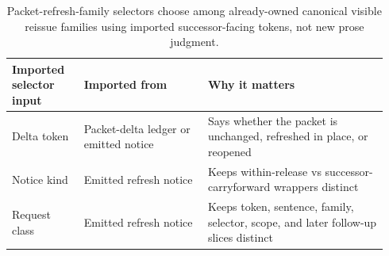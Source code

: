 \documentclass[11pt]{article}
\begin{document}
\begin{table}[t]
\centering
\small
\begin{tabularx}{\linewidth}{@{}p{0.18\linewidth} p{0.31\linewidth} p{0.45\linewidth}@{}}
\toprule
Imported selector input & Imported from & Why it matters \\
\midrule
Delta token & Packet-delta ledger or emitted notice & Says whether the packet is unchanged, refreshed in place, or reopened \\
Notice kind & Emitted refresh notice & Keeps within-release vs successor-carryforward wrappers distinct \\
Request class & Emitted refresh notice & Keeps token, sentence, family, selector, scope, and later follow-up slices distinct \\
\bottomrule
\end{tabularx}
\caption{Packet-refresh-family selectors choose among already-owned canonical visible reissue families using imported successor-facing tokens, not new prose judgment.}
\label{tab:publicrequestresponsepacketrefreshnoticeselections}
\end{table}
\end{document}
